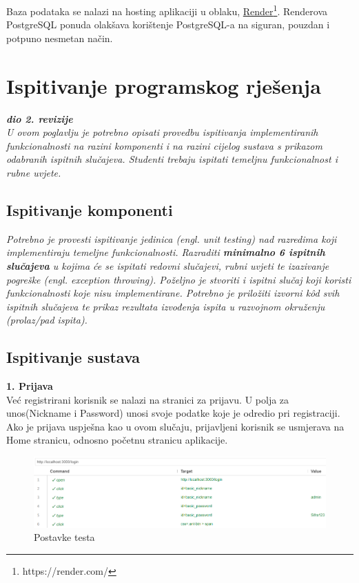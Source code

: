 			 Baza podataka se nalazi na hosting aplikaciji u oblaku, \underline{Render}\footnote{https://render.com/}. Renderova PostgreSQL ponuda olakšava korištenje PostgreSQL-a na siguran, pouzdan i potpuno nesmetan način.\\
			 			
			\eject 
		
	
		\section{Ispitivanje programskog rješenja}
			
			\textbf{\textit{dio 2. revizije}}\\
			
			 \textit{U ovom poglavlju je potrebno opisati provedbu ispitivanja implementiranih funkcionalnosti na razini komponenti i na razini cijelog sustava s prikazom odabranih ispitnih slučajeva. Studenti trebaju ispitati temeljnu funkcionalnost i rubne uvjete.}
	
			
			\subsection{Ispitivanje komponenti}
			\textit{Potrebno je provesti ispitivanje jedinica (engl. unit testing) nad razredima koji implementiraju temeljne funkcionalnosti. Razraditi \textbf{minimalno 6 ispitnih slučajeva} u kojima će se ispitati redovni slučajevi, rubni uvjeti te izazivanje pogreške (engl. exception throwing). Poželjno je stvoriti i ispitni slučaj koji koristi funkcionalnosti koje nisu implementirane. Potrebno je priložiti izvorni kôd svih ispitnih slučajeva te prikaz rezultata izvođenja ispita u razvojnom okruženju (prolaz/pad ispita). }
			
			
			
			\subsection{Ispitivanje sustava}
			 
			\textbf{1. Prijava}\\
				
				Već registrirani korisnik se nalazi na stranici za prijavu. U polja za unos(Nickname i Password) unosi svoje podatke koje je odredio pri registraciji. Ako je prijava uspješna kao u ovom slučaju, prijavljeni korisnik se usmjerava na Home stranicu, odnosno početnu stranicu aplikacije.
				
				\begin{figure}[H]
					\includegraphics[width=\textwidth]{slike/UspjesnaPrijava1.PNG} 
					\caption{Postavke testa}
					\label{fig:UspjesnaPrijava1}
				\end{figure}


